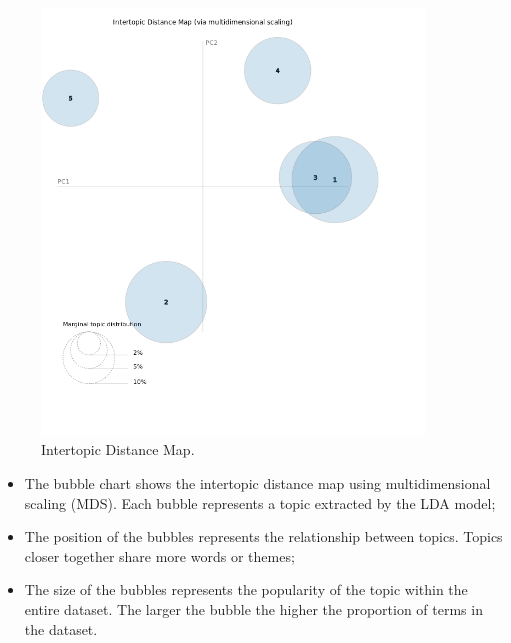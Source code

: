\begin{center}
\begin{figure}[H]
  \centering
  \includegraphics[width=4in]{img/topics/png/topics.png}
  \caption{Intertopic Distance Map.}
  \label{Figure:intertopicdistancemap}
\end{figure}
\end{center}

\begin{itemize}
  \item The bubble chart shows the intertopic distance map using
    multidimensional scaling (MDS). Each bubble represents a topic extracted by
    the LDA model;
  \item The position of the bubbles represents the relationship between topics.
    Topics closer together share more words or themes;
  \item The size of the bubbles represents the popularity of the topic within
    the entire dataset. The larger the bubble the higher the proportion of
    terms in the dataset.
\end{itemize}



